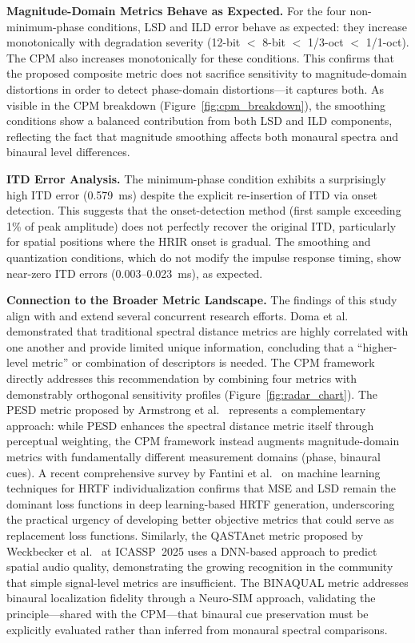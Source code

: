 \documentclass[12pt,a4paper]{article}
\begin{document}
\textbf{Magnitude-Domain Metrics Behave as Expected.}
For the four non-minimum-phase conditions, LSD and ILD error behave as expected: they increase monotonically with degradation severity (12-bit $<$ 8-bit $<$ 1/3-oct $<$ 1/1-oct). The CPM also increases monotonically for these conditions. This confirms that the proposed composite metric does not sacrifice sensitivity to magnitude-domain distortions in order to detect phase-domain distortions---it captures both. As visible in the CPM breakdown (Figure~\ref{fig:cpm_breakdown}), the smoothing conditions show a balanced contribution from both LSD and ILD components, reflecting the fact that magnitude smoothing affects both monaural spectra and binaural level differences.

\textbf{ITD Error Analysis.}
The minimum-phase condition exhibits a surprisingly high ITD error (0.579~ms) despite the explicit re-insertion of ITD via onset detection. This suggests that the onset-detection method (first sample exceeding 1\% of peak amplitude) does not perfectly recover the original ITD, particularly for spatial positions where the HRIR onset is gradual. The smoothing and quantization conditions, which do not modify the impulse response timing, show near-zero ITD errors (0.003--0.023~ms), as expected.

\textbf{Connection to the Broader Metric Landscape.}
The findings of this study align with and extend several concurrent research efforts. Doma et al.\ \cite{doma2023} demonstrated that traditional spectral distance metrics are highly correlated with one another and provide limited unique information, concluding that a ``higher-level metric'' or combination of descriptors is needed. The CPM framework directly addresses this recommendation by combining four metrics with demonstrably orthogonal sensitivity profiles (Figure~\ref{fig:radar_chart}). The PESD metric proposed by Armstrong et al.\ \cite{armstrong2024} represents a complementary approach: while PESD enhances the spectral distance metric itself through perceptual weighting, the CPM framework instead augments magnitude-domain metrics with fundamentally different measurement domains (phase, binaural cues). A recent comprehensive survey by Fantini et al.\ \cite{fantini2025} on machine learning techniques for HRTF individualization confirms that MSE and LSD remain the dominant loss functions in deep learning-based HRTF generation, underscoring the practical urgency of developing better objective metrics that could serve as replacement loss functions. Similarly, the QASTAnet metric proposed by Weckbecker et al.\ \cite{weckbecker2025} at ICASSP~2025 uses a DNN-based approach to predict spatial audio quality, demonstrating the growing recognition in the community that simple signal-level metrics are insufficient. The BINAQUAL metric \cite{panah2025} addresses binaural localization fidelity through a Neuro-SIM approach, validating the principle---shared with the CPM---that binaural cue preservation must be explicitly evaluated rather than inferred from monaural spectral comparisons.
\end{document}
